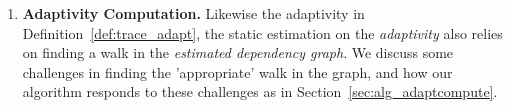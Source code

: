 \begin{enumerate}
\item \textbf{Adaptivity Computation.} 
Likewise the adaptivity in Definition~\ref{def:trace_adapt},
the static estimation on the \emph{adaptivity} also relies on finding a walk in the \emph{estimated dependency graph}.  
We discuss some challenges in finding the 'appropriate' walk in the graph, and how our algorithm responds to these challenges as
in Section~\ref{sec:alg_adaptcompute}.
\end{enumerate}
